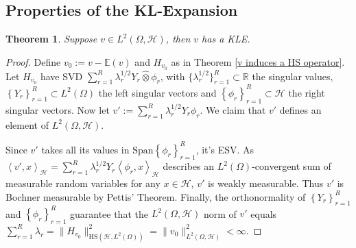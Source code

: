 \documentclass{article}
\newtheorem{theorem}{Theorem}
\numberwithin{theorem}{section}
\numberwithin{lemma}{section}
\numberwithin{definition}{section}
\numberwithin{assumption}{section}
\numberwithin{proposition}{section}
\numberwithin{remark}{section}
\numberwithin{corollary}{section}
\numberwithin{conjecture}{section}
\numberwithin{example}{section}
\newcommand{\R}{\mathbb{R}}
\newcommand{\E}{\mathbb{E}}
\newcommand{\bset}[1]{\left \lbrace #1 \right \rbrace}
\newcommand{\aset}[1]{\left \langle #1 \right \rangle}
\newcommand{\Span}[1]{\mathrm{Span}\bset{#1}}
\begin{document}
\begin{multicols*}{2}

\subsection{Properties of the KL-Expansion}
\label{Properties of the KL-Expansion}

\begin{theorem} \label{v has a KLE}
    Suppose $v \in L^2(\Omega, \mathcal H)$, then $v$ has a KLE. 
\end{theorem}

\begin{proof}
    Define $v_0 := v - \E(v)$ and $H_{v_0}$ as in Theorem \ref{v induces a HS operator}. Let $H_{v_0}$ have SVD $\sum_{r=1}^R \lambda_r^{1/2} Y_r \widehat \otimes \phi_r$, with $\{ \lambda_r^{1/2} \}_{r=1}^R \subset \R$ the singular values, $\bset{Y_r}_{r=1}^R \subset L^2(\Omega)$ the left singular vectors and $\bset{\phi_r}_{r=1}^R \subset \mathcal H$ the right singular vectors. Now let $v' := \sum_{r=1}^R \lambda_r^{1/2} Y_r \phi_r$. We claim that $v'$ defines an element of $L^2(\Omega, \mathcal H)$. 

    Since $v'$ takes all its values in $\Span{\phi_r}_{r=1}^R$, it's ESV. As $\aset{v',x}_\mathcal H = \sum_{r=1}^R \lambda_r^{1/2} Y_r \aset{\phi_r, x}_\mathcal H$ describes an $L^2(\Omega)$-convergent sum of measurable random variables for any $x \in \mathcal H$, $v'$ is weakly measurable. Thus $v'$ is Bochner measurable by Pettis' Theorem. Finally, the orthonormality of $\bset{Y_r}_{r=1}^R$ and $\bset{\phi_r}_{r=1}^R$ guarantee that the $L^2(\Omega, \mathcal H)$ norm of $v'$ equals $\sum_{r=1}^R \lambda_r = \|H_{v_0}\|^2_{\text{HS}(\mathcal H, L^2(\Omega))} = \|v_0 \|^2_{L^2(\Omega, \mathcal H)} < \infty$.


\end{proof}
\end{multicols*}
\end{document}
